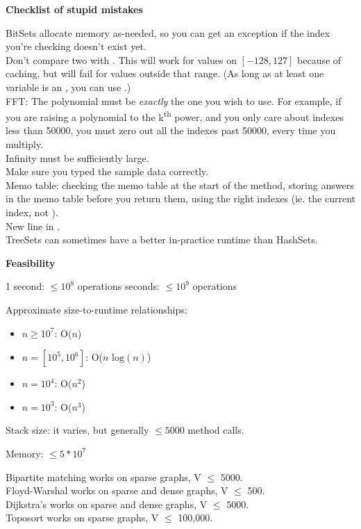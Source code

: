
\textbf{Checklist of stupid mistakes}

\indent BitSets allocate memory as-needed, so you can get an  exception if the index you're checking doesn't exist yet. \\
\indent Don't compare two  with \inline{==}. This will work for values on $[-128, 127]$ because of caching, but will fail for values outside that range. (As long as at least one variable is an , you can use \inline{==}.) \\
\indent FFT: The polynomial must be \textit{exactly} the one you wish to use. For example, if you are raising a polynomial to the k\textsuperscript{th} power, and you only care about indexes less than 50000, you must zero out all the indexes past 50000, every time you multiply. \\
\indent Infinity must be sufficiently large. \\
\indent Make sure you typed the sample data correctly. \\
\indent Memo table: checking the memo table at the start of the method, storing answers in the memo table before you return them, using the right indexes (ie. the current index, not ). \\
\indent New line in . \\ 
\indent TreeSets can sometimes have a better in-practice runtime than HashSets. 

\textbf{Feasibility}

1 second: $\leq 10^8$ operations \indent{} seconds: $\leq 10^9$ operations

Approximate size-to-runtime relationships:
\begin{itemize}
    \item $n \geq 10^7$: O($n$)
    \item $n = [10^5, 10^6]$: O($n\text{ log}(n)$)
    \item $n = 10^4$: O($n^2$)
    \item $n = 10^3$: O($n^3$)
\end{itemize}

Stack size: it varies, but generally $\leq 5000$ method calls.

Memory: $\leq 5*10^7$

Bipartite matching works on sparse graphs, V $\leq$ 5000. \\
Floyd-Warshal works on sparse and dense graphs, V $\leq$ 500. \\
Dijkstra’s works on sparse and dense graphs, V $\leq$ 5000. \\
Toposort works on sparse graphs, V $\leq$ 100,000.

